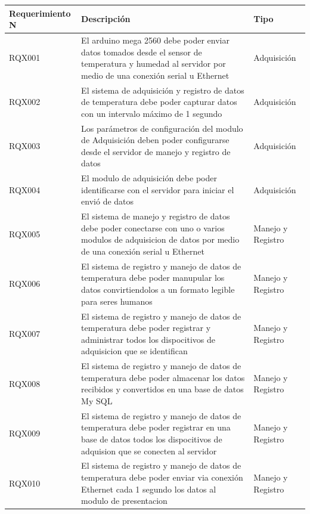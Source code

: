 \begin{table}[h!]
\begin{center}
\begin{tabular}{|p{30mm}|p{70mm}|p{30mm}|}
\hline
\rowcolor[RGB]{255,127,0} Requerimiento N & Descripción & Tipo \\
\hline
RQX001 & El arduino mega 2560 debe poder enviar datos tomados desde el sensor
de temperatura y humedad al servidor por medio de una conexión serial  u
Ethernet & Adquisición\\
\hline
RQX002 & El sistema de adquisición y registro de datos de temperatura debe poder
capturar datos con un intervalo máximo de 1 segundo & Adquisición \\
\hline
RQX003 & Los parámetros de configuración del modulo de Adquisición deben poder
configurarse desde el servidor de manejo y registro de datos & Adquisición \\
\hline
RQX004 & El modulo de adquisición debe poder identificarse con el servidor para
iniciar el envió de datos & Adquisición \\
\hline
RQX005 & El sistema de manejo y registro de datos debe poder conectarse con uno
o varios modulos de adquisicion de datos por medio de una conexión serial u
Ethernet & Manejo y Registro \\
\hline
RQX006 & El sistema de registro y manejo de datos de temperatura debe poder
manupular los  datos convirtiendolos a un formato legible para seres humanos &
Manejo y Registro\\
\hline
RQX007 & El sistema de registro y manejo de datos de temperatura debe poder
registrar y administrar todos los dispocitivos de adquisicion que se identifican
& Manejo y Registro\\
\hline
RQX008 & El sistema de registro y manejo de datos de temperatura debe poder
almacenar los datos recibidos y convertidos en una base de datos My SQL & Manejo
y Registro\\
\hline
RQX009 & El sistema de registro y manejo de datos de temperatura debe poder
registrar en una base de datos todos los dispocitivos de adquision que se
conecten al servidor & Manejo y Registro \\
\hline
RQX010 & El sistema de registro y manejo de datos de temperatura debe poder 
enviar via conexión Ethernet cada 1 segundo los datos al modulo de presentacion
& Manejo y Registro\\
\hline
\end{tabular}
\end{center}
\end{table}

